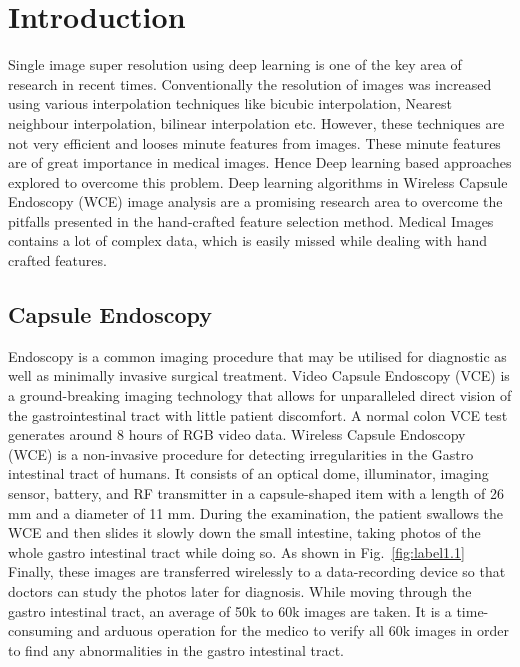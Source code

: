 %
\chapter{Introduction}
Single image super resolution using deep learning is one of the key area of research in recent times. Conventionally the resolution of images was increased using various interpolation techniques like bicubic interpolation, Nearest neighbour interpolation, bilinear interpolation etc. However, these techniques are not very efficient and looses minute features from images. These minute features are of great importance in medical images. Hence Deep learning based approaches explored to overcome this problem. Deep learning algorithms in Wireless Capsule Endoscopy (WCE) image analysis are a promising research area to overcome the pitfalls presented in the hand-crafted feature selection method. Medical Images contains a lot of complex data, which is easily missed while dealing with hand crafted features.

\section{Capsule Endoscopy}
Endoscopy is a common imaging procedure that may be utilised for diagnostic as well as minimally invasive surgical treatment. Video Capsule Endoscopy (VCE) is a ground-breaking imaging technology that allows for unparalleled direct vision of the gastrointestinal tract with little patient discomfort. A normal colon VCE test generates around 8 hours of RGB video data. Wireless Capsule Endoscopy (WCE) is a non-invasive procedure for detecting irregularities in the Gastro intestinal tract of humans. It consists of an optical dome, illuminator, imaging sensor, battery, and RF transmitter in a capsule-shaped item with a length of 26 mm and a diameter of 11 mm. During the examination, the patient swallows the WCE and then slides it slowly down the small intestine, taking photos of the whole gastro intestinal tract while doing so. As shown in Fig.~\ref{fig:label1.1} Finally, these images are transferred wirelessly to a data-recording device so that doctors can study the photos later for diagnosis. While moving through the gastro intestinal tract, an average of 50k to 60k images are taken. It is a time-consuming and arduous operation for the medico to verify all 60k images in order to find any abnormalities in the gastro intestinal tract. 

